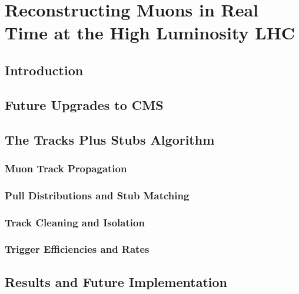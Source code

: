 
\chapter{Reconstructing Muons in Real Time at the High Luminosity LHC}

\section{Introduction}

\section{Future Upgrades to CMS}

\section{The Tracks Plus Stubs Algorithm}

\subsection{Muon Track Propagation}

\subsection{Pull Distributions and Stub Matching}

\subsection{Track Cleaning and Isolation}

\subsection{Trigger Efficiencies and Rates}

\section{Results and Future Implementation}
